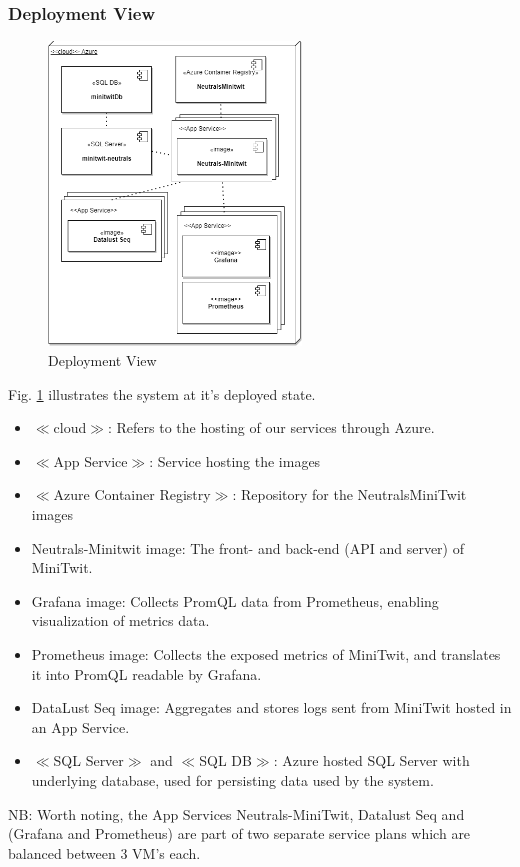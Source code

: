\documentclass{article}
\begin{document}
\subsubsection*{Deployment View}
\begin{figure}[H]
\centering
\includegraphics[width=0.6\textwidth]{images/Deployment View Point.png}
\caption{\label{fig:dview}Deployment View}
\end{figure}

Fig. \ref{fig:dview} illustrates the system at it's deployed state. 
\begin{itemize}
    \item $\ll$cloud$\gg$: Refers to the hosting of our services through Azure.
    \item $\ll$App Service$\gg$: Service hosting the images
    \item $\ll$Azure Container Registry$\gg$: Repository for the NeutralsMiniTwit images
    \item Neutrals-Minitwit image: The front- and back-end (API and server) of MiniTwit.
    \item Grafana image: Collects PromQL data from Prometheus, enabling visualization of metrics data.
    \item Prometheus image: Collects the exposed metrics of MiniTwit, and translates it into PromQL readable by Grafana.
    \item DataLust Seq image: Aggregates and stores logs sent from MiniTwit hosted in an App Service.
    \item $\ll$SQL Server$\gg$ and $\ll$SQL DB$\gg$: Azure hosted SQL Server with underlying database, used for persisting data used by the system.
\end{itemize}
NB: Worth noting, the App Services Neutrals-MiniTwit, Datalust Seq and (Grafana and Prometheus) are part of two separate service plans which are balanced between 3 VM's each. 
\end{document}
